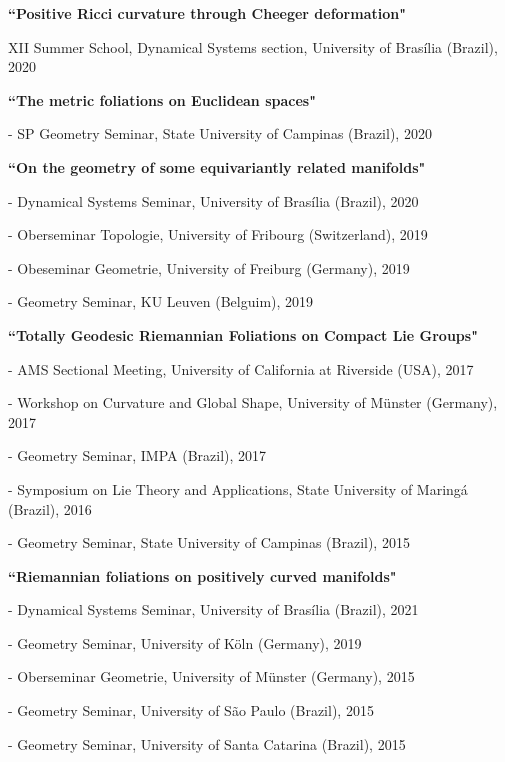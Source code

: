 \documentclass[10pt]{article}
\newenvironment{innerlist}[1][\enskip\textbullet]%
        {\begin{compactitem}[#1]}{\end{compactitem}}
\newcommand{\blankline}{\quad\pagebreak[2]}
\begin{document}
\textbf{``Positive Ricci curvature through Cheeger deformation" }
\begin{innerlist}
\item[] XII Summer School, Dynamical Systems section,  University of Brasília (Brazil), 2020
\end{innerlist}

\blankline

\textbf{``The metric foliations on Euclidean spaces"}
\begin{innerlist}
	\item[]- SP Geometry Seminar, State University of Campinas (Brazil), 2020
\end{innerlist}




\blankline

\textbf{``On the geometry of some equivariantly related manifolds"}
\begin{innerlist}
\item[]- Dynamical Systems Seminar, University of Brasília (Brazil), 2020
\item[]- Oberseminar Topologie, University of Fribourg (Switzerland), 2019
\item[]- Obeseminar Geometrie, University of Freiburg (Germany), 2019
\item[]- Geometry Seminar, KU Leuven (Belguim), 2019
\end{innerlist}



\blankline

\textbf{``Totally Geodesic Riemannian Foliations on Compact Lie Groups"}
\begin{innerlist}
\item[]- AMS Sectional Meeting, University of California at Riverside (USA), 2017
\item[]- Workshop on Curvature and Global Shape, University of M\"unster (Germany), 2017
\item[]- Geometry Seminar, IMPA (Brazil), 2017
\item[]- Symposium on Lie Theory and Applications, State University of Maringá (Brazil), 2016
\item[]- Geometry Seminar, State University of Campinas (Brazil), 2015
\end{innerlist}


\blankline

\textbf{``Riemannian foliations on positively curved manifolds"}
\begin{innerlist}
	\item[]- Dynamical Systems Seminar, University of Brasília (Brazil), 2021
\item[]- Geometry Seminar, University of K\"oln (Germany), 2019
\item[]- Oberseminar Geometrie, University of M\"unster (Germany), 2015
\item[]- Geometry Seminar, University of São Paulo (Brazil), 2015
\item[]- Geometry Seminar, University of Santa Catarina (Brazil), 2015
\end{innerlist}
\end{document}
